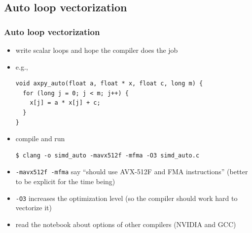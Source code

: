 \documentclass[12pt,dvipdfmx]{beamer}
\newcommand{\ao}[1]{{\color{blue}#1}}
\begin{document}
\subsection{Auto loop vectorization}

\begin{frame}[fragile]
\frametitle{Auto loop vectorization}
\begin{itemize}
\item write scalar loops and hope the compiler does the job
\item e.g.,
\begin{lstlisting}
void axpy_auto(float a, float * x, float c, long m) {
  for (long j = 0; j < m; j++) {
    x[j] = a * x[j] + c;
  }
}
\end{lstlisting}

\item compile and run
\begin{lstlisting}
$ clang -o simd_auto -mavx512f -mfma -O3 simd_auto.c
\end{lstlisting} %

\item \ao{\tt -mavx512f -mfma} say ``should use AVX-512F and FMA instructions''
  (better to be explicit for the time being)
\item \ao{\tt -O3} increases the optimization level (so the compiler should work hard to vectorize it)
\item read the notebook about options of other compilers (NVIDIA and GCC)
\end{itemize}
\end{frame}
\end{document}
